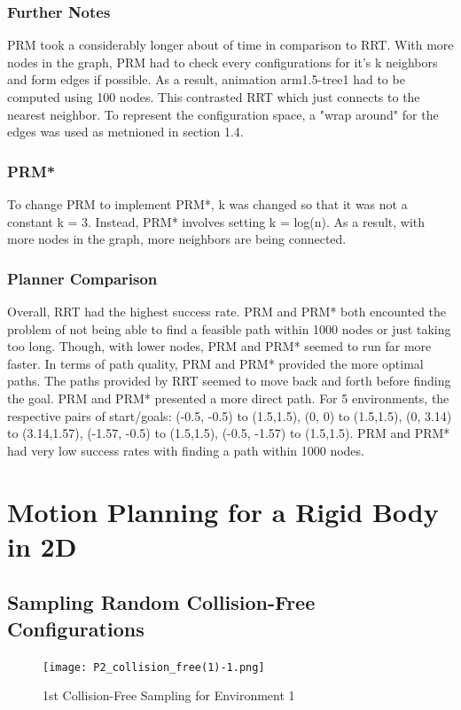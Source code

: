 \documentclass{article}
\begin{document}
\subsubsection{Further Notes}
PRM took a considerably longer about of time in comparison to RRT. With more nodes in the graph, PRM had to check every configurations for it's k neighbors and form edges if possible. As a result, animation arm1.5-tree1 had to be computed using 100 nodes. This contrasted RRT which just connects to the nearest neighbor. To represent the configuration space, a "wrap around" for the edges was used as metnioned in section 1.4. 
\subsubsection{PRM*}
To change PRM to implement PRM*, k was changed so that it was not a constant k = 3. Instead, PRM* involves setting k = log(n). As a result, with more nodes in the graph, more neighbors are being connected. 
\subsubsection{Planner Comparison}
Overall, RRT had the highest success rate. PRM and PRM* both encounted the problem of not being able to find a feasible path within 1000 nodes or just taking too long. Though, with lower nodes, PRM and PRM* seemed to run far more faster. In terms of path quality, PRM and PRM* provided the more optimal paths. The paths provided by RRT seemed to move back and forth before finding the goal. PRM and PRM* presented a more direct path. For 5 environments, the respective pairs of start/goals: (-0.5, -0.5) to (1.5,1.5), (0, 0) to (1.5,1.5), (0, 3.14) to (3.14,1.57), (-1.57, -0.5) to (1.5,1.5), (-0.5, -1.57) to (1.5,1.5). PRM and PRM* had very low success rates with finding a path within 1000 nodes.
\maketitle
\section{Motion Planning for a Rigid Body in 2D}
\subsection{Sampling Random Collision-Free Configurations}
\begin{figure}[h!]
	\texttt{[image: P2\_collision\_free(1)-1.png]}
	\centering
	\caption{1st Collision-Free Sampling for Environment 1}
	\label{P2_collision_free(1)-1.png}
\end{figure}
\end{document}
